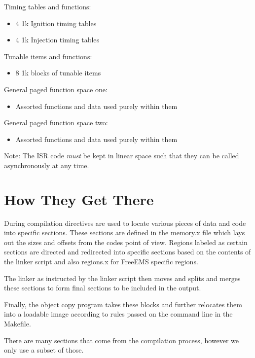 \documentclass[12pt,a4wide,titlepage]{article}
\begin{document}
\begin{titlepage}
\begin{center}
Timing tables and functions:

\begin{itemize}
\item 4 1k Ignition timing tables
\item 4 1k Injection timing tables
\end{itemize}


Tunable items and functions:

\begin{itemize}
\item 8 1k blocks of tunable items
\end{itemize}


General paged function space one:

\begin{itemize}
\item Assorted functions and data used purely within them
\end{itemize}


General paged function space two:

\begin{itemize}
\item Assorted functions and data used purely within them
\end{itemize}


Note: The ISR code \emph{must} be kept in linear space such that they can be
called asynchronously at any time.




\section{How They Get There}

During compilation directives are used to locate various pieces of data and code into specific sections. These sections are defined in the memory.x file which lays out the sizes and offsets from the codes point of view. Regions labeled as certain sections are directed and redirected into specific sections based on the contents of the linker script and also regions.x for FreeEMS specific regions.

The linker as instructed by the linker script then moves and splits and merges these sections to form final sections to be included in the output.

Finally, the object copy program takes these blocks and further relocates them into a loadable image according to rules passed on the command line in the Makefile.

There are many sections that come from the compilation process, however we only use a subset of those.


\end{center}
\end{titlepage}
\end{document}
